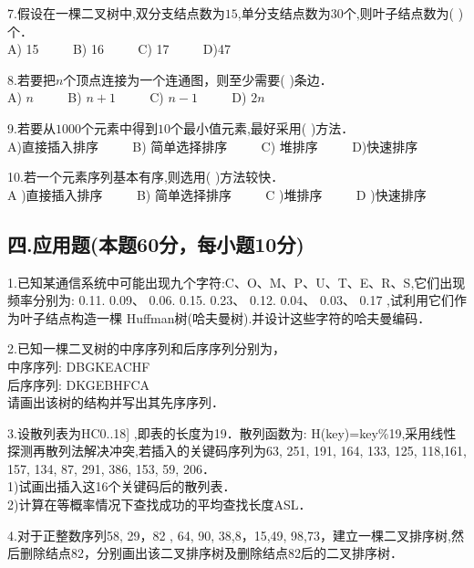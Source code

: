 7.假设在一棵二叉树中,双分支结点数为$15$,单分支结点数为$30$个,则叶子结点数为(  )个． \\
A) 15 $\qquad$ B) 16 $\qquad$ C) 17 $\qquad$ D)47

8.若要把$n$个顶点连接为一个连通图，则至少需要(   )条边． \\
A) $n$ $\qquad$ B) $n+1$ $\qquad$ C) $n-1$ $\qquad$ D) $2n$

9.若要从$1000$个元素中得到$10$个最小值元素,最好采用(    )方法． \\
A)直接插入排序 $\qquad$ B) 简单选择排序 $\qquad$ C) 堆排序 $\qquad$ D)快速排序

10.若一个元素序列基本有序,则选用(  )方法较快． \\
A )直接插入排序 $\qquad$ B) 简单选择排序 $\qquad$ C )堆排序 $\qquad$ D )快速排序

\subsection{四.应用题(本题60分，每小题10分)}

1.已知某通信系统中可能出现九个字符:C、O、M、P、U、T、E、R、S,它们出现频率分别为: 0.11. 0.09、 0.06. 0.15. 0.23、 0.12. 0.04、 0.03、 0.17 ,试利用它们作为叶子结点构造一棵 Huffman树(哈夫曼树).并设计这些字符的哈夫曼编码．

2.已知一棵二叉树的中序序列和后序序列分别为， \\
中序序列: DBGKEACHF \\
后序序列: DKGEBHFCA \\
请画出该树的结构并写出其先序序列．

3.设散列表为HC0..18] ,即表的长度为19．散列函数为: H(key)=key\%19,采用线性探测再散列法解决冲突,若插入的关键码序列为{63, 251, 191, 164, 133, 125, 118,161, 157, 134, 87, 291, 386, 153, 59, 206}． \\
1)试画出插入这16个关键码后的散列表． \\
2)计算在等概率情况下查找成功的平均查找长度ASL．

4.对于正整数序列{58, 29，82 , 64, 90, 38,8，15,49, 98,73}，建立一棵二叉排序树,然后删除结点82，分别画出该二叉排序树及删除结点82后的二叉排序树．
